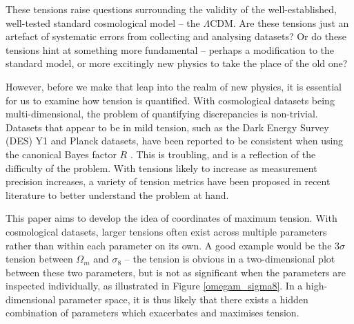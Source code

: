 \documentclass[%
 reprint,
 amsmath,amssymb,
 aps,
]{revtex4-2}
\begin{document}
These tensions raise questions surrounding the validity of the well-established, well-tested standard cosmological model -- the $\Lambda$CDM. Are these tensions just an artefact of systematic errors from collecting and analysing datasets? Or do these tensions hint at something more fundamental -- perhaps a modification to the standard model, or more excitingly new physics to take the place of the old one?

However, before we make that leap into the realm of new physics, it is essential for us to examine how tension is quantified. With cosmological datasets being multi-dimensional, the problem of quantifying discrepancies is non-trivial. Datasets that appear to be in mild tension, such as the Dark Energy Survey (DES) Y1 and Planck datasets, have been reported to be consistent when using the canonical Bayes factor $R$ \cite{Handley2019}. This is troubling, and is a reflection of the difficulty of the problem. With tensions likely to increase as measurement precision increases, a variety of tension metrics have been proposed in recent literature \cite{Charnock2017} to better understand the problem at hand.

This paper aims to develop the idea of coordinates of maximum tension. With cosmological datasets, larger tensions often exist across multiple parameters rather than within each parameter on its own. A good example would be the $3 \sigma$ tension between $\Omega_m$ and $\sigma_8$ -- the tension is obvious in a two-dimensional plot between these two parameters, but is not as significant when the parameters are inspected individually, as illustrated in Figure \ref{omegam_sigma8}. In a high-dimensional parameter space, it is thus likely that there exists a hidden combination of parameters which exacerbates and maximises tension.
\end{document}
